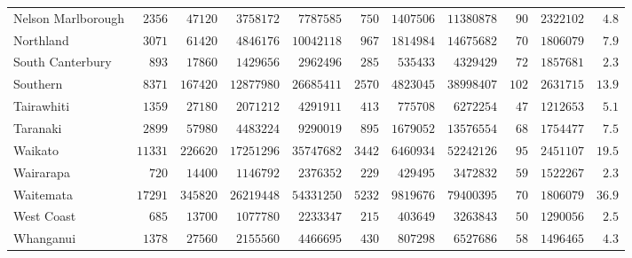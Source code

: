 \documentclass{article}
\begin{document}
\begin{table}
\begin{center}
\begin{tabular}{lrrrrrrrrrr}
Nelson Marlborough&$ 2356$&$ 47120$&$ 3758172$&$ 7787585$&$ 750$&$ 1407506$&$11380878$&$ 90$&$2322102$&$ 4.8$\tabularnewline
Northland&$ 3071$&$ 61420$&$ 4846176$&$10042118$&$ 967$&$ 1814984$&$14675682$&$ 70$&$1806079$&$ 7.9$\tabularnewline
South Canterbury&$  893$&$ 17860$&$ 1429656$&$ 2962496$&$ 285$&$  535433$&$ 4329429$&$ 72$&$1857681$&$ 2.3$\tabularnewline
Southern&$ 8371$&$167420$&$12877980$&$26685411$&$2570$&$ 4823045$&$38998407$&$102$&$2631715$&$13.9$\tabularnewline
Tairawhiti&$ 1359$&$ 27180$&$ 2071212$&$ 4291911$&$ 413$&$  775708$&$ 6272254$&$ 47$&$1212653$&$ 5.1$\tabularnewline
Taranaki&$ 2899$&$ 57980$&$ 4483224$&$ 9290019$&$ 895$&$ 1679052$&$13576554$&$ 68$&$1754477$&$ 7.5$\tabularnewline
Waikato&$11331$&$226620$&$17251296$&$35747682$&$3442$&$ 6460934$&$52242126$&$ 95$&$2451107$&$19.5$\tabularnewline
Wairarapa&$  720$&$ 14400$&$ 1146792$&$ 2376352$&$ 229$&$  429495$&$ 3472832$&$ 59$&$1522267$&$ 2.3$\tabularnewline
Waitemata&$17291$&$345820$&$26219448$&$54331250$&$5232$&$ 9819676$&$79400395$&$ 70$&$1806079$&$36.9$\tabularnewline
West Coast&$  685$&$ 13700$&$ 1077780$&$ 2233347$&$ 215$&$  403649$&$ 3263843$&$ 50$&$1290056$&$ 2.5$\tabularnewline
Whanganui&$ 1378$&$ 27560$&$ 2155560$&$ 4466695$&$ 430$&$  807298$&$ 6527686$&$ 58$&$1496465$&$ 4.3$\tabularnewline
\hline
\end{tabular}\end{center}\label{table:cost20}
\end{table}
\end{document}
